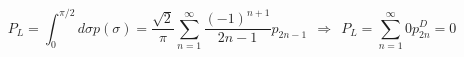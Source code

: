 \begin{equation}P_L=\int_0^{\pi/2}d\sigma
p(\sigma)=\frac{\sqrt{2}}{\pi}\sum_{n=1}^\infty
\frac{(-1)^{n+1}}{2n-1}p_{2n-1}\ \ \Longrightarrow\ \
P_L=\sum_{n=1}^{\infty}0 p^D_{2n}=0\label{eq:P_L}\end{equation}

